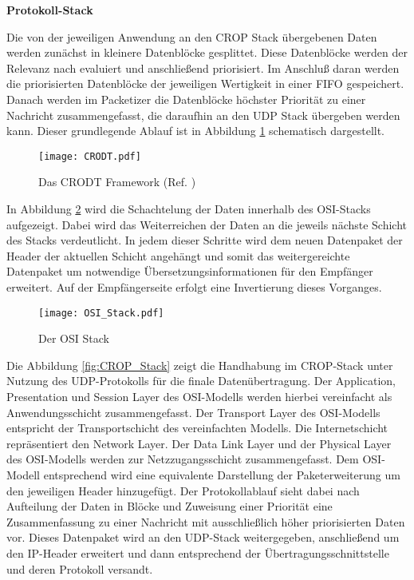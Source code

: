 \textbf{Protokoll-Stack} \label{sec:Konzept_Protocolstack}

Die von der jeweiligen Anwendung an den \gls{CROP} Stack {\"u}bergebenen Daten
werden zun{\"a}chst in kleinere Datenbl{\"o}cke gesplittet. Diese Datenbl{\"o}cke
werden der Relevanz nach evaluiert und anschlie{\ss}end priorisiert.
Im Anschlu{\ss} daran werden die priorisierten Datenbl{\"o}cke der jeweiligen
Wertigkeit in einer \gls{FIFO} gespeichert. Danach werden im
Packetizer die Datenbl{\"o}cke h{\"o}chster Priorit{\"a}t zu einer
Nachricht zusammengefasst, die daraufhin an den \gls{UDP} Stack {\"u}bergeben
werden kann. Dieser grundlegende Ablauf ist in Abbildung \ref{fig:CRODT} schematisch
dargestellt.

\begin{figure}[H]
\centering
\texttt{[image: CRODT.pdf]}
\caption[Das CRODT Framework]{Das CRODT Framework (Ref. \cite{Daher})}
\label{fig:CRODT}
\end{figure}

In Abbildung \ref{fig:OSI_Stack} wird die Schachtelung der Daten
innerhalb des OSI-Stacks aufgezeigt. Dabei wird das Weiterreichen der Daten an
die jeweils n{\"a}chste Schicht des Stacks verdeutlicht. In jedem dieser Schritte wird dem neuen
Datenpaket der Header der aktuellen Schicht angeh{\"a}ngt und somit das
weitergereichte Datenpaket um notwendige {\"U}bersetzungsinformationen f{\"u}r
den Empf{\"a}nger erweitert. Auf der Empf{\"a}ngerseite erfolgt eine Invertierung dieses
Vorganges. 

\begin{figure}[H]
\centering
\texttt{[image: OSI\_Stack.pdf]}
\caption{Der OSI Stack}
\label{fig:OSI_Stack}
\end{figure}
 
Die Abbildung \ref{fig:CROP_Stack} zeigt die Handhabung im CROP-Stack
unter Nutzung des \gls{UDP}-Protokolls f{\"u}r die finale Daten{\"u}bertragung. Der
Application, Presentation und Session Layer des OSI-Modells
werden hierbei vereinfacht als Anwendungsschicht zusammengefasst.
Der Transport Layer des OSI-Modells entspricht der Transportschicht des
vereinfachten Modells. Die Internetschicht repr{\"a}sentiert den Network
Layer.
Der Data Link Layer und der Physical Layer des OSI-Modells werden zur
Netzzugangsschicht zusammengefasst. Dem OSI-Modell entsprechend wird eine
equivalente Darstellung der Paketerweiterung um den jeweiligen Header
hinzugef{\"u}gt. Der Protokollablauf sieht dabei nach Aufteilung der Daten in
Bl{\"o}cke und Zuweisung einer Priorit{\"a}t eine Zusammenfassung zu einer
Nachricht mit ausschließlich höher priorisierten Daten vor. Dieses Datenpaket
wird an den \gls{UDP}-Stack weitergegeben, anschlie{\ss}end um den
\gls{IP}-Header erweitert und dann entsprechend der
{\"U}bertragungsschnittstelle und deren Protokoll versandt.

